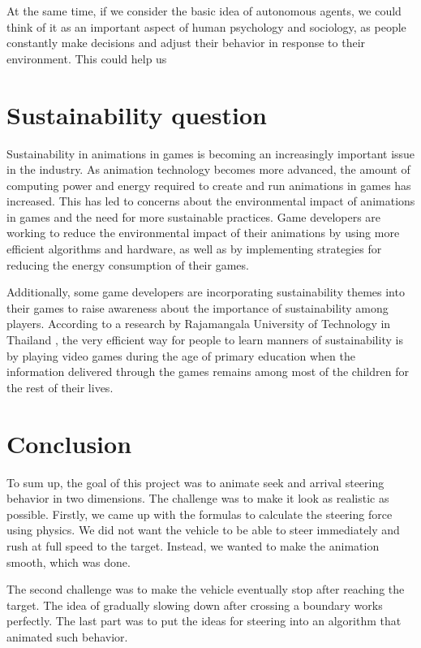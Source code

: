\documentclass[10pt,twoside,english,a4paper]{article}
\begin{document}
At the same time, if we consider the basic idea of autonomous agents,
we could think of it as an important aspect of human psychology and sociology, as 
people constantly make decisions and adjust their behavior in response to their 
environment. This could help us 

\section{Sustainability question} \label{sustainability} 

Sustainability in animations in games is becoming an increasingly important 
issue in the industry. As animation technology becomes more advanced, the amount 
of computing power and energy required to create and run animations in games has 
increased. This has led to concerns about the environmental impact of animations 
in games and the need for more sustainable practices. 
Game developers are working to reduce the environmental impact of their animations
by using more efficient 
algorithms and hardware, as well as by implementing strategies for reducing the 
energy consumption of their games. 

Additionally, some game developers are 
incorporating sustainability themes into their games to raise awareness about 
the importance of sustainability among players. 
According to a research by
Rajamangala University of Technology in Thailand \cite{phong}, the very efficient way for 
people to learn manners of sustainability is by playing video games during 
the age of primary education when the information delivered through the games 
remains among most of the children for the rest of their lives.

\section{Conclusion} \label{conclusion}

To sum up, the goal of this project was to animate seek and arrival 
steering behavior in two dimensions. The challenge was to 
make it look as realistic as possible. Firstly, we came 
up with the formulas to calculate the steering force using 
physics. We did not want the vehicle to be able to 
steer immediately and rush at full speed to the target. Instead, 
we wanted to make the animation smooth, which was done. 

The second challenge was to make the vehicle eventually stop after 
reaching the target. The idea of gradually slowing down after 
crossing a boundary works perfectly. The last part was to put the ideas
for steering into an algorithm that animated such behavior. 
\end{document}
